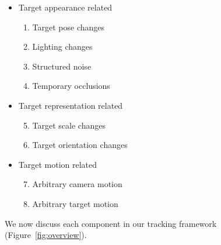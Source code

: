 \begin{itemize}

\item Target appearance related
\begin{enumerate}\setcounter{enumi}{0}
\item Target pose changes
\item Lighting changes
\item Structured noise
\item Temporary occlusions
\end{enumerate}

\item Target representation related
\begin{enumerate}\setcounter{enumi}{4}
\item Target scale changes
\item Target orientation changes
\end{enumerate}

\item Target motion related
\begin{enumerate}\setcounter{enumi}{6}
\item Arbitrary camera motion
\item Arbitrary target motion
\end{enumerate}

\end{itemize}



We now discuss each component in our tracking framework (Figure~\ref{fig:overview}).  

